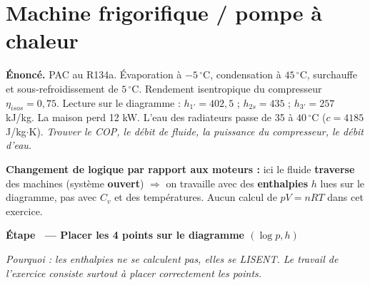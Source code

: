 \documentclass[10.5pt,a4paper]{article}
\newcounter{et}[section]
\newcommand{\etape}[1]{%
  \refstepcounter{et}%
  \medskip\par\noindent
  {\color{cbleu}\bfseries Étape \theet\ --- #1}\par\nobreak\smallskip}
\newcommand{\pq}[1]{{\color{cgris}\itshape\small Pourquoi : #1\par}\smallskip}
\begin{document}
\newpage
\section{Machine frigorifique / pompe à chaleur}

\begin{enonce}
\textbf{Énoncé.} PAC au R134a. Évaporation à $-5\,^\circ$C, condensation à $45\,^\circ$C, surchauffe et
sous-refroidissement de $5\,^\circ$C. Rendement isentropique du compresseur $\eta_{isos}=0{,}75$.
Lecture sur le diagramme : $h_{1'}=402{,}5$ ; $h_{2s}=435$ ; $h_{3'}=257$ kJ/kg. La maison perd 12 kW.
L'eau des radiateurs passe de 35 à $40\,^\circ$C ($c=4185$ J/kg$\cdot$K).
\emph{Trouver le COP, le débit de fluide, la puissance du compresseur, le débit d'eau.}
\end{enonce}

\begin{reflexe}
\textbf{Changement de logique par rapport aux moteurs :} ici le fluide \textbf{traverse} des machines
(système \textbf{ouvert}) $\Rightarrow$ on travaille avec des \textbf{enthalpies} $h$ lues sur le
diagramme, pas avec $C_v$ et des températures. Aucun calcul de $pV=nRT$ dans cet exercice.
\end{reflexe}

\etape{Placer les 4 points sur le diagramme $(\log p,h)$}
\pq{les enthalpies ne se calculent pas, elles se LISENT. Le travail de l'exercice consiste surtout à
placer correctement les points.}

\begin{center}
\end{center}
\end{document}
